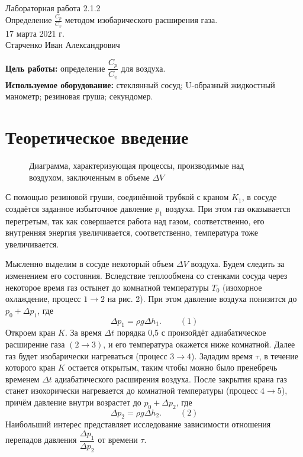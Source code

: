 




\setcounter{page}{1}



\begin{center}
  \LARGE{Лабораторная работа 2.1.2}\\[0.2cm]
  \LARGE{Определение $\frac{C_p}{C_v}$ методом изобарического расширения газа.}\\[0.2cm]
  \large{17 марта 2021 г.}\\[0.2cm]
  \large{Старченко Иван Александрович}\\[0.2cm]
\end{center}

\textbf{Цель работы:} определение $\dfrac{C_p}{C_v}$ для воздуха.\\

\textbf{Используемое оборудование:} стеклянный сосуд; U-образный жидкостный манометр; резиновая груша; секундомер.

\section{Теоретическое введение}

\begin{figure}[h]
	\caption{Диаграмма, характеризующая процессы, производимые над воздухом, заключенным в объеме $\Delta V$}
\end{figure}


С помощью резиновой груши, соединённой трубкой с краном $K_1$, в сосуде создаётся заданное избыточное давление $p_1$ воздуха. При этом газ оказывается перегретым, так как совершается работа над газом, соответственно, его внутренняя энергия увеличивается, соответственно, температура тоже увеличивается.

Мысленно выделим в сосуде некоторый объем $\Delta V$ воздуха. Будем следить за изменением его состояния. Вследствие теплообмена со стенками сосуда через некоторое время газ остынет до комнатной температуры $T_0$ (изохорное охлаждение, процесс $1 \longrightarrow 2$ на рис. 2). При этом давление воздуха понизится до $p_0 + \Delta p_1$, где $$\Delta p_1 = \rho g \Delta h_1.~~~~~~~~~~(1)$$
Откроем кран $K$. За время $\Delta t$ порядка 0,5 с произойдёт адиабатическое расширение газа $(2 \longrightarrow 3)$, и его температура окажется ниже комнатной. Далее газ будет изобарически нагреваться (процесс $3 \longrightarrow 4$). Зададим время $\tau$, в течение которого кран $K$ остается открытым, таким чтобы можно было пренебречь временем $\Delta t$ адиабатического расширения воздуха. После закрытия крана газ станет изохорически нагревается до комнатной температуры (процесс $4 \longrightarrow 5$), причём давление внутри возрастет до $p_0 + \Delta p_2$, где $$\Delta p_2 = \rho g \Delta h_2.~~~~~~~~~~(2)$$
Наибольший интерес представляет исследование зависимости отношения перепадов давления $\dfrac{\Delta p_1}{\Delta p_2}$ от времени $\tau$.

